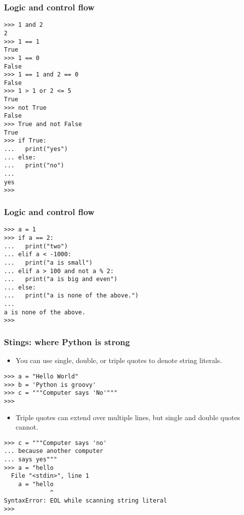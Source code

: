 \documentclass[handout]{beamer}
\numberwithin{equation}{section}
\begin{document}
\begin{frame}[fragile]
\frametitle{Logic and control flow}

\begin{lstlisting}[name=ex]
>>> 1 and 2
2
>>> 1 == 1
True
>>> 1 == 0
False
>>> 1 == 1 and 2 == 0
False
>>> 1 > 1 or 2 <= 5
True
>>> not True
False
>>> True and not False
True
>>> if True:
...   print("yes")
... else:
...   print("no")
... 
yes
>>> 
\end{lstlisting}
\end{frame}

\begin{frame}[fragile]
\frametitle{Logic and control flow}

\begin{lstlisting}[name=ex]
>>> a = 1
>>> if a == 2:
...   print("two")
... elif a < -1000:
...   print("a is small")
... elif a > 100 and not a % 2:
...   print("a is big and even")
... else:
...   print("a is none of the above.")
... 
a is none of the above.
>>> 
\end{lstlisting}
\end{frame}







\begin{frame}[fragile]
\frametitle{Stings: where Python is strong}

\begin{itemize}
\item You can use single, double, or triple quotes to denote string literals.
\end{itemize}

\begin{lstlisting}[name=ex]
>>> a = "Hello World"
>>> b = 'Python is groovy'
>>> c = """Computer says 'No'"""
>>> 
\end{lstlisting}

\pause 
\begin{itemize}
\item Triple quotes can extend over multiple lines, but single and double quotes cannot.
\end{itemize}

\begin{lstlisting}[name=ex]
>>> c = """Computer says 'no'
... because another computer
... says yes"""
>>> a = "hello
  File "<stdin>", line 1
    a = "hello
             ^
SyntaxError: EOL while scanning string literal
>>> 
\end{lstlisting}
\end{frame}
\end{document}
